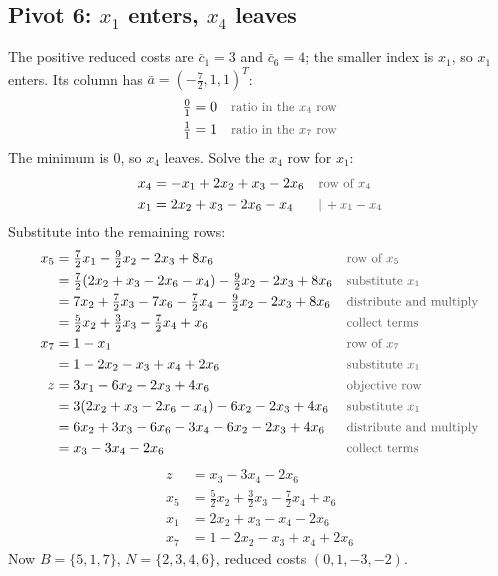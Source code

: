 \documentclass[a4paper,11pt]{article}
\newif\ifexplain
\newcommand{\teil}[1]{\subsection*{#1}}
\newcommand{\why}[1]{\text{\small\color{black!65}#1}}
\newcommand{\explain}[1]{\ifexplain\begin{erklbox}#1\end{erklbox}\fi}
\begin{document}
\teil{Pivot 6: $x_1$ enters, $x_4$ leaves}
The positive reduced costs are $\bar c_1=3$ and $\bar c_6=4$; the smaller index is $x_1$, so $x_1$ enters. Its column has $\bar a = (-\tfrac72,1,1)^T$:
\begin{align*}
\tfrac{0}{1} &= 0 && \why{ratio in the $x_4$ row}\\
\tfrac{1}{1} &= 1 && \why{ratio in the $x_7$ row}
\end{align*}
The minimum is $0$, so $x_4$ leaves. Solve the $x_4$ row for $x_1$:
\begin{align*}
x_4 &= -x_1 + 2x_2 + x_3 - 2x_6 && \why{row of $x_4$}\\
x_1 &= 2x_2 + x_3 - 2x_6 - x_4 && \why{$|\,+x_1 - x_4$}
\end{align*}
Substitute into the remaining rows:
\begin{align*}
x_5 &= \tfrac72 x_1 - \tfrac92 x_2 - 2x_3 + 8x_6 && \why{row of $x_5$}\\
&= \tfrac72(2x_2 + x_3 - 2x_6 - x_4) - \tfrac92 x_2 - 2x_3 + 8x_6 && \why{substitute $x_1$}\\
&=7x_2+\tfrac72x_3-7x_6-\tfrac72x_4-\tfrac92x_2-2x_3+8x_6 && \why{distribute and multiply}\\
&= \tfrac52 x_2 + \tfrac32 x_3 - \tfrac72 x_4 + x_6 && \why{collect terms}\\
x_7 &= 1 - x_1 && \why{row of $x_7$}\\
&= 1 - 2x_2 - x_3 + x_4 + 2x_6 && \why{substitute $x_1$}\\
z &= 3x_1 - 6x_2 - 2x_3 + 4x_6 && \why{objective row}\\
&= 3(2x_2 + x_3 - 2x_6 - x_4) - 6x_2 - 2x_3 + 4x_6 && \why{substitute $x_1$}\\
&=6x_2+3x_3-6x_6-3x_4-6x_2-2x_3+4x_6 && \why{distribute and multiply}\\
&= x_3 - 3x_4 - 2x_6 && \why{collect terms}
\end{align*}
\[
\begin{aligned}
z &= x_3 - 3x_4 - 2x_6\\
x_5 &= \tfrac52 x_2 + \tfrac32 x_3 - \tfrac72 x_4 + x_6\\
x_1 &= 2x_2 + x_3 - x_4 - 2x_6\\
x_7 &= 1 - 2x_2 - x_3 + x_4 + 2x_6
\end{aligned}
\]
Now $B=\{5,1,7\}$, $N=\{2,3,4,6\}$, reduced costs $(0,1,-3,-2)$.

\explain{Die reduzierte Kostenkomponente von $x_6$ ist größer. Trotzdem tritt $x_1$ ein, weil Bland den kleinsten zulässigen Index nimmt. Die Regel maximiert nicht den unmittelbaren Zielfortschritt.}
\end{document}
